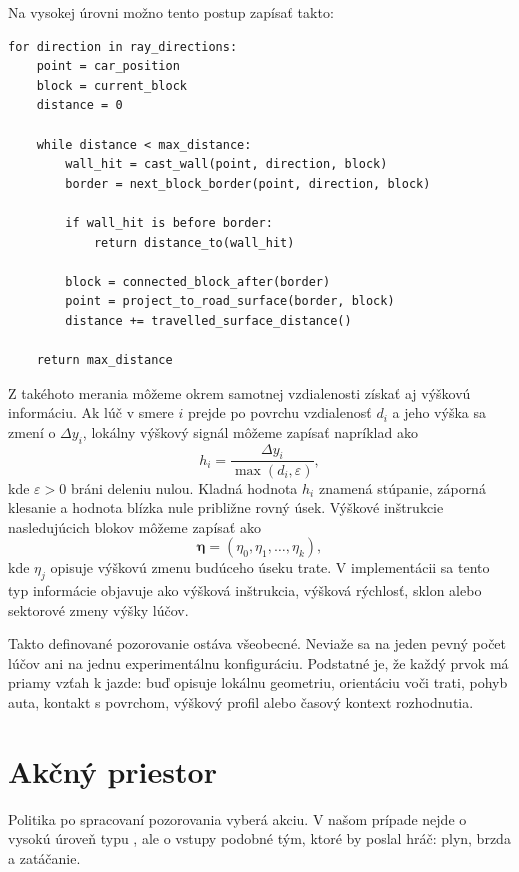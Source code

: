 Na vysokej úrovni možno tento postup zapísať takto:

\begin{lstlisting}[caption={Vysokourovňový pseudokód lúča pri výškových rozdieloch},label={alg:height_profile_raycast}]
for direction in ray_directions:
    point = car_position
    block = current_block
    distance = 0

    while distance < max_distance:
        wall_hit = cast_wall(point, direction, block)
        border = next_block_border(point, direction, block)

        if wall_hit is before border:
            return distance_to(wall_hit)

        block = connected_block_after(border)
        point = project_to_road_surface(border, block)
        distance += travelled_surface_distance()

    return max_distance
\end{lstlisting}

Z takéhoto merania môžeme okrem samotnej vzdialenosti získať aj výškovú informáciu. Ak lúč v smere \(i\) prejde po povrchu vzdialenosť \(d_i\) a jeho výška sa zmení o \(\Delta y_i\), lokálny výškový signál môžeme zapísať napríklad ako
\[
    h_i = \frac{\Delta y_i}{\max(d_i,\varepsilon)},
\]
kde \(\varepsilon > 0\) bráni deleniu nulou. Kladná hodnota \(h_i\) znamená stúpanie, záporná klesanie a hodnota blízka nule približne rovný úsek. Výškové inštrukcie nasledujúcich blokov môžeme zapísať ako
\[
    \boldsymbol{\eta}
    =
    (\eta_0, \eta_1, \ldots, \eta_k),
\]
kde \(\eta_j\) opisuje výškovú zmenu budúceho úseku trate. V implementácii sa tento typ informácie objavuje ako výšková inštrukcia, výšková rýchlosť, sklon alebo sektorové zmeny výšky lúčov.

Takto definované pozorovanie ostáva všeobecné. Neviaže sa na jeden pevný počet lúčov ani na jednu experimentálnu konfiguráciu. Podstatné je, že každý prvok má priamy vzťah k jazde: buď opisuje lokálnu geometriu, orientáciu voči trati, pohyb auta, kontakt s povrchom, výškový profil alebo časový kontext rozhodnutia.

\section{Akčný priestor}

Politika po spracovaní pozorovania vyberá akciu. V našom prípade nejde o vysokú úroveň typu , ale o vstupy podobné tým, ktoré by poslal hráč: plyn, brzda a zatáčanie.

